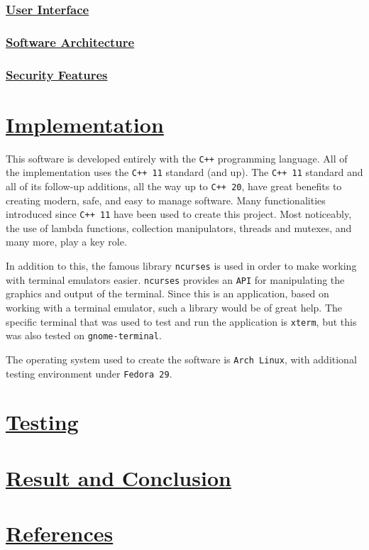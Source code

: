 \documentclass{article}
\newcommand{\code}[1]{\colorbox{codebg}{{\color{black}\texttt{#1}}}}
\begin{document}
\subsubsection{\underline{User Interface}}

\subsubsection{\underline{Software Architecture}}

\subsubsection{\underline{Security Features}}

\section{\underline{Implementation}}

This software is developed entirely with the \code{C++} programming language. All of the implementation uses the \code{C++ 11} standard (and up). The \code{C++ 11} standard and all of its follow-up additions, all the way up to \code{C++ 20}, have great benefits to creating modern, safe, and easy to manage software. Many functionalities introduced since \code{C++ 11} have been used to create this project. Most noticeably, the use of lambda functions, collection manipulators, threads and mutexes, and many more, play a key role.

In addition to this, the famous library \code{ncurses} is used in order to make working with terminal emulators easier. \code{ncurses} provides an \code{API} for manipulating the graphics and output of the terminal. Since this is an application, based on working with a terminal emulator, such a library would be of great help. The specific terminal that was used to test and run the application is \code{xterm}, but this was also tested on \code{gnome-terminal}.

The operating system used to create the software is \code{Arch Linux}, with additional testing environment under \code{Fedora 29}.

\section{\underline{Testing}}

\section{\underline{Result and Conclusion}}

\section{\underline{References}}
\end{document}
